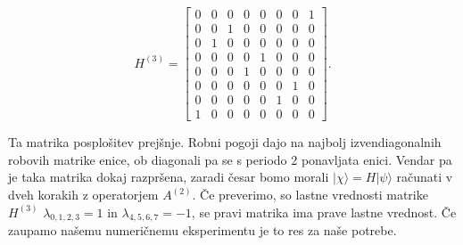\documentclass[a4 paper, 12pt]{article}
\begin{document}
\begin{equation}
	H^{(3)} = \begin{bmatrix}
	0 & 0 & 0 & 0 & 0 & 0 & 0 & 1 \\
	0 & 0 & 1 & 0 & 0 & 0 & 0 & 0 \\
	0 & 1 & 0 & 0 & 0 & 0 & 0 & 0 \\
	0 & 0 & 0 & 0 & 1 & 0 & 0 & 0 \\
	0 & 0 & 0 & 1 & 0 & 0 & 0 & 0 \\
	0 & 0 & 0 & 0 & 0 & 0 & 1 & 0 \\
	0 & 0 & 0 & 0 & 0 & 1 & 0 & 0 \\
	1 & 0 & 0 & 0 & 0 & 0 & 0 & 0
	\end{bmatrix}.
\end{equation}

Ta matrika posplošitev prejšnje. Robni pogoji dajo na najbolj izvendiagonalnih robovih matrike enice, ob diagonali pa
se s periodo 2 ponavljata enici.
Vendar pa je taka matrika dokaj razpršena, zaradi česar bomo morali $|\chi\rangle = H |\psi\rangle$ računati v dveh
korakih z operatorjem $A^{(2)}$. Če preverimo, so lastne vrednosti matrike $H^{(3)}$ $\lambda_{0,1,2,3} = 1$ in
$\lambda_{4,5,6,7} = -1$, se pravi matrika ima prave lastne vrednost. Če zaupamo našemu numeričnemu eksperimentu je to
res za naše potrebe.
\end{document}
